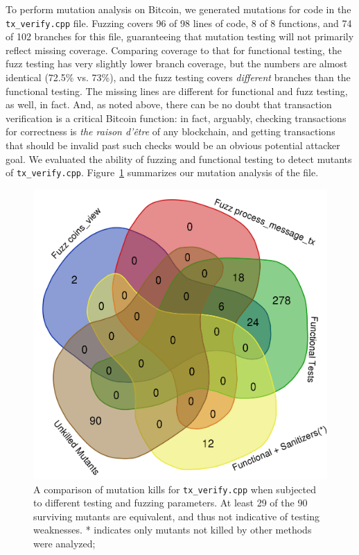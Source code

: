\begin{sloppypar}

To perform mutation analysis on Bitcoin, we generated mutations for code in the
{\tt tx\_verify.cpp} file.  Fuzzing covers 96 of 98 lines of code, 8
of 8 functions, and 74 of 102 branches for this file, guaranteeing
that mutation testing will not primarily reflect missing coverage.
Comparing coverage to that for functional testing, the fuzz testing
has very slightly lower branch coverage, but the numbers are almost
identical (72.5\% vs. 73\%), and the fuzz testing covers \emph{different} branches than
the functional testing.  The missing lines are different for
functional and fuzz testing, as well, in fact.  And, as noted above,
there can be no doubt that transaction verification is a critical
Bitcoin function: in fact, arguably, checking transactions for
correctness is \emph{the raison d'être} of any blockchain, and getting
transactions that should be invalid past such checks would be an
obvious potential attacker goal.
We evaluated the ability of fuzzing and functional testing
to detect mutants of {\tt tx\_verify.cpp}. Figure~\ref{kills} summarizes our mutation
analysis of the file.

\begin{figure}
\vspace{2mm}
\includegraphics[width=0.9\columnwidth]{kill_pre_valgrind.png}
\caption{A comparison of mutation kills for {\tt tx\_verify.cpp} when
  subjected to different testing and fuzzing parameters.  At least 29
  of the 90 surviving mutants are equivalent, and thus not indicative
  of testing weaknesses.  * indicates
  only mutants not killed by other methods were analyzed;}
\label{kills}
\end{figure}


\end{sloppypar}
